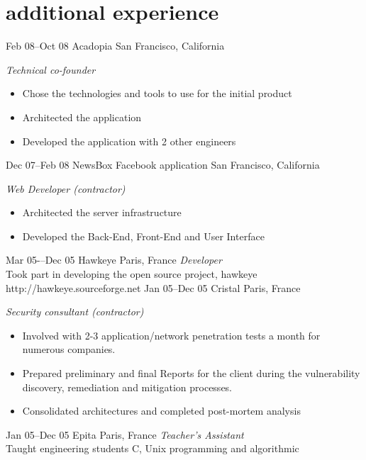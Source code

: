 \documentclass[]{friggeri-cv} %
\begin{document}
\section{additional experience}
\begin{entrylist}
\entry
{Feb 08--Oct 08}
{Acadopia}
{San Francisco, California}
{\emph{Technical co-founder } \\
\begin{itemize}
\item Chose the technologies and tools to use for the initial product
\item Architected the application
\item Developed the application with 2 other engineers
\end{itemize}}
\entry
{Dec 07--Feb 08}
{NewsBox Facebook application}
{San Francisco, California}
{\emph{Web Developer (contractor)} \\
\begin{itemize}
\item Architected the server infrastructure
\item Developed the Back-End, Front-End and User Interface
\end{itemize}}
\entry
{Mar 05-–Dec 05}
{Hawkeye}
{Paris, France}
{\emph{Developer} \\
Took part in developing the open source project, hawkeye \\ 
http://hawkeye.sourceforge.net}
\entry
{Jan 05--Dec 05}
{Cristal}
{Paris, France}
{\emph{Security consultant (contractor)} \\
\begin{itemize}
\item Involved with 2-3 application/network penetration tests a month for numerous companies.
\item Prepared preliminary and final Reports for the client during the vulnerability discovery, remediation and mitigation processes.
\item Consolidated architectures and completed post-mortem analysis
\end{itemize}}
\entry
{Jan 05--Dec 05}
{Epita}
{Paris, France}
{\emph{Teacher’s Assistant} \\
Taught engineering students C, Unix programming and algorithmic}


\end{entrylist}

\end{document}
